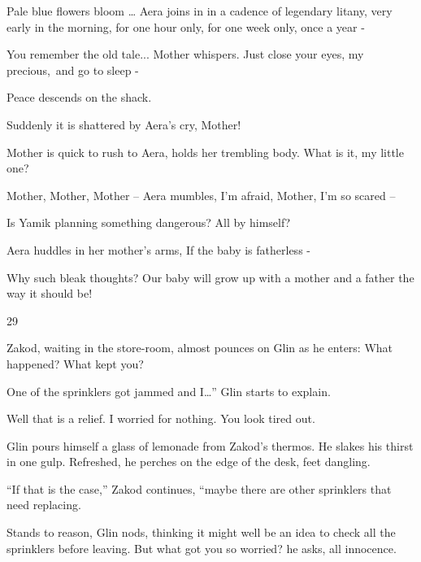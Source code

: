 \documentclass[letterpaper]{article}
\begin{document}
{\textquotedbl}Pale blue flowers bloom {\dots}{\textquotedbl} Aera joins in in a cadence of legendary litany,
{\textquotedbl}very early in the morning, for one hour only, for one week only, once a year -{\textquotedbl}

{\textquotedbl}You remember the old tale...{\textquotedbl} Mother whispers. {\textquotedbl}Just close your eyes, my
precious,~and go to sleep -{\textquotedbl} 

Peace descends on the shack. 

Suddenly it is shattered by Aera's cry, {\textquotedbl}Mother!{\textquotedbl} 

Mother is quick to rush to Aera, holds her trembling body. {\textquotedbl}What is it, my little one?{\textquotedbl} 

{\textquotedbl}Mother, Mother, Mother --{\textquotedbl} Aera mumbles, {\textquotedbl}I'm afraid, Mother, I'm so scared
--{\textquotedbl} 

{\textquotedbl}Is Yamik planning something dangerous? All by himself?{\textquotedbl} 

Aera huddles in her mother's arms, {\textquotedbl}If the baby is fatherless -{\textquotedbl}

{\textquotedbl}Why such bleak thoughts? Our baby will grow up with a mother and a father the way it should
be!{\textquotedbl}


\bigskip

29~~ 

Zakod, waiting in the store-room, almost pounces on Glin as he enters: {\textquotedbl}What happened? What kept
you?{\textquotedbl} 

{\textquotedbl}One of the sprinklers got jammed and I{\dots}'' Glin starts to explain. 

{\textquotedbl}Well that is a relief. I worried for nothing. You look tired out.{\textquotedbl} 

Glin pours himself a glass of lemonade from Zakod's thermos. He\textcolor[rgb]{0.0,0.4392157,0.7529412}{ }slakes his
thirst in one gulp. Refreshed, he perches on the edge of the desk, feet dangling. 

{}``If that is the case,'' Zakod continues, ``maybe there are other sprinklers that need replacing.{\textquotedbl} 

{\textquotedbl}Stands to reason,{\textquotedbl} Glin nods, thinking it might well be an idea to check all the sprinklers
before leaving. {\textquotedbl}But what got you so worried?{\textquotedbl} he asks, all innocence. 
\end{document}
